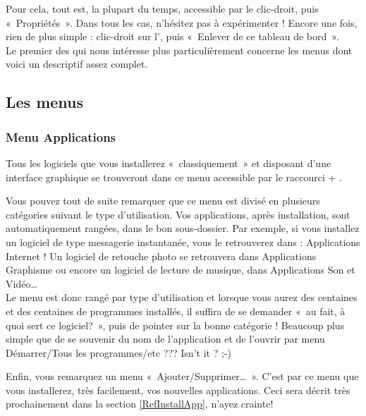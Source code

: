 Pour cela, tout est, la plupart du temps, accessible par le clic-droit, puis «~Propriétés~». Dans tous les cas, n'hésitez pas à expérimenter !
Encore une fois, rien de plus simple : clic-droit sur l', puis «~Enlever de ce tableau de bord~».\\
Le premier des  qui nous intéresse plus particulièrement concerne les menus dont voici un  descriptif assez complet.
\subsection{Les menus}
\label{RefMenuGNOME}
\subsubsection{Menu Applications}
Tous les logiciels que vous installerez «~classiquement~» et disposant d'une interface graphique se trouveront dans ce menu accessible par le raccourci  + .\par
Vous pouvez tout de suite remarquer que ce menu est divisé en plusieurs catégories suivant le type d'utilisation. Vos applications, après installation, sont automatiquement rangées, dans le bon sous-dossier. Par exemple, si vous installez un logiciel de type messagerie instantanée, vous le retrouverez dans : Applications \FlecheDroite Internet ! Un logiciel de retouche photo  se retrouvera dans Applications \FlecheDroite Graphisme ou encore un logiciel de lecture de musique, dans Applications \FlecheDroite Son et Vidéo\ldots{}\\
Le menu est donc rangé par type d'utilisation et lorsque vous aurez des centaines et des centaines de programmes installés, il suffira de se demander «~au fait, à quoi sert ce logiciel?~», puis de pointer sur la bonne catégorie ! Beaucoup plus simple que de se souvenir du nom de l'application et de l'ouvrir par menu Démarrer/Tous les programmes/etc ??? Isn't it ? ;-)\par
Enfin, vous remarquez un menu «~Ajouter/Supprimer\dots{}~». C'est par ce menu que vous installerez, très facilement, vos nouvelles applications. Ceci sera décrit très prochainement dans la section \ref{RefInstallApp}, n'ayez crainte!\\
